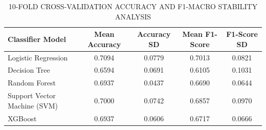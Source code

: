\begin{table}[htbp]
\centering
\caption{\uppercase{10-Fold Cross-Validation Accuracy and F1-Macro Stability Analysis}}
\label{tab:cv_results}
\begin{tabular}{lcccc}
\hline
\textbf{Classifier Model} & \textbf{Mean Accuracy} & \textbf{Accuracy SD} & \textbf{Mean F1-Score} & \textbf{F1-Score SD} \\
\hline
Logistic Regression & 0.7094 & 0.0779 & 0.7013 & 0.0821 \\
Decision Tree & 0.6594 & 0.0691 & 0.6105 & 0.1031 \\
Random Forest & 0.6937 & 0.0437 & 0.6690 & 0.0644 \\
Support Vector Machine (SVM) & 0.7000 & 0.0742 & 0.6857 & 0.0970 \\
XGBoost & 0.6937 & 0.0606 & 0.6717 & 0.0666 \\
\hline
\end{tabular}
\end{table}
